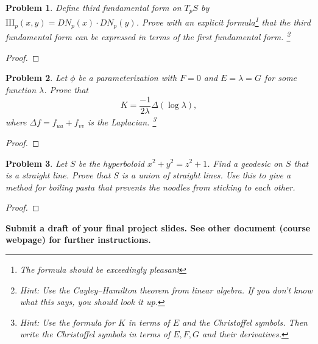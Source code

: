 \documentclass[11pt]{article}
\newtheorem{problem}{Problem}
\begin{document}
\begin{problem}
Define third fundamental form on $T_pS$ by $\mathrm{I\!I\!I}_p(x,y)= DN_p(x)\cdot DN_p(y)$. Prove with an explicit formula\footnote{The formula should be exceedingly pleasant} that the third fundamental form can be expressed in terms of the first fundamental form. \footnote{Hint: Use the Cayley--Hamilton theorem from linear algebra. If you don't know what this says, you should look it up.}
\end{problem}

\begin{proof}

\end{proof}

\begin{problem}
Let $\phi$ be a parameterization with $F=0$ and $E=\lambda=G$ for some function $\lambda$. Prove that 
\[K=\frac{-1}{2\lambda}\Delta(\log\lambda),\]
where $\Delta f=f_{uu}+f_{vv}$ is the Laplacian. \footnote{Hint: Use the formula for $K$ in terms of $E$ and the Christoffel symbols. Then write the Christoffel symbols in terms of $E,F,G$ and their derivatives.}
\end{problem}

\begin{proof}

\end{proof}


\begin{problem}
Let $S$ be the hyperboloid $x^2+y^2=z^2+1$. Find a geodesic on $S$ that is a straight line. Prove that $S$ is a union of straight lines. Use this to give a method for boiling pasta that prevents the noodles from sticking to each other. 
\end{problem}

\begin{proof}

\end{proof}

\pagebreak

{\bf Submit a draft of your final project slides. See other document (course webpage) for further instructions. }
\end{document}
